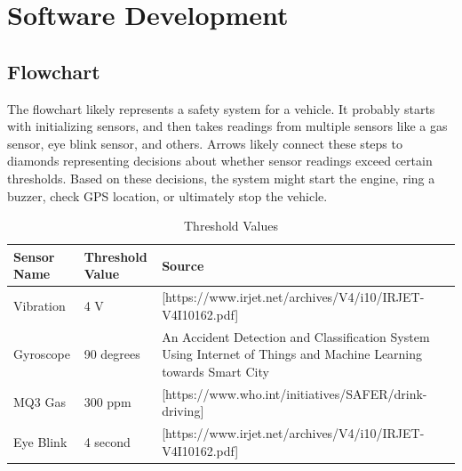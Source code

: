 \documentclass[12pt,a4paper]{report}
\begin{document}
	\section{Software Development}
	\subsection{Flowchart}
 \begin{justify}
     The flowchart likely represents a safety system for a vehicle. It probably starts with initializing sensors, and then takes readings from multiple sensors like a gas sensor, eye blink sensor, and others.  Arrows likely connect these steps to diamonds representing decisions about whether sensor readings exceed certain thresholds. Based on these decisions,  the system might start the engine, ring a buzzer, check GPS location,  or ultimately stop the vehicle.
     \vspace{5cm}
     	\begin{table}[h]
\centering
\caption{Threshold Values}
\label{tab:sensor_info} %
\begin{tabular}{|p{3cm}|p{3cm}|p{9cm}|}
\hline
\textbf{Sensor Name} & \textbf{Threshold Value} & \textbf{Source} \\ \hline
Vibration & 4 V & [https://www.irjet.net/archives/V4/i10/IRJET-V4I10162.pdf] \\ \hline
Gyroscope & 90 degrees & An Accident Detection and Classification System Using Internet of Things and Machine Learning towards Smart City  \\ \hline
MQ3 Gas & 300 ppm & [https://www.who.int/initiatives/SAFER/drink-driving] \\ \hline
Eye Blink & 4 second & [https://www.irjet.net/archives/V4/i10/IRJET-V4I10162.pdf]\\ \hline
\end{tabular}
\end{table}
       \end{justify}
\end{document}
